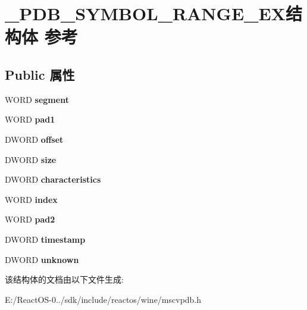 \hypertarget{struct___p_d_b___s_y_m_b_o_l___r_a_n_g_e___e_x}{}\section{\+\_\+\+P\+D\+B\+\_\+\+S\+Y\+M\+B\+O\+L\+\_\+\+R\+A\+N\+G\+E\+\_\+\+E\+X结构体 参考}
\label{struct___p_d_b___s_y_m_b_o_l___r_a_n_g_e___e_x}
\subsection*{Public 属性}
\begin{DoxyCompactItemize}
\item 
\mbox{\label{struct___p_d_b___s_y_m_b_o_l___r_a_n_g_e___e_x_a964df6111b7fced045dd6389792e33ec}} 
W\+O\+RD {\bfseries segment}
\item 
\mbox{\label{struct___p_d_b___s_y_m_b_o_l___r_a_n_g_e___e_x_accf9baa9d39d5050175b8f8a92213c52}} 
W\+O\+RD {\bfseries pad1}
\item 
\mbox{\label{struct___p_d_b___s_y_m_b_o_l___r_a_n_g_e___e_x_abb47c5de465886303caef059b462fe79}} 
D\+W\+O\+RD {\bfseries offset}
\item 
\mbox{\label{struct___p_d_b___s_y_m_b_o_l___r_a_n_g_e___e_x_a991e4667b04ad1c483434e9f9f84250e}} 
D\+W\+O\+RD {\bfseries size}
\item 
\mbox{\label{struct___p_d_b___s_y_m_b_o_l___r_a_n_g_e___e_x_a758443325ecdde3918be0b73a1a7ef1b}} 
D\+W\+O\+RD {\bfseries characteristics}
\item 
\mbox{\label{struct___p_d_b___s_y_m_b_o_l___r_a_n_g_e___e_x_adbe4299b80516b399b1712f8200e0b47}} 
W\+O\+RD {\bfseries index}
\item 
\mbox{\label{struct___p_d_b___s_y_m_b_o_l___r_a_n_g_e___e_x_a10b3e88641b7daa9f7cb648aedf4c337}} 
W\+O\+RD {\bfseries pad2}
\item 
\mbox{\label{struct___p_d_b___s_y_m_b_o_l___r_a_n_g_e___e_x_a03edcbb3b384202db4cc1a8b96252588}} 
D\+W\+O\+RD {\bfseries timestamp}
\item 
\mbox{\label{struct___p_d_b___s_y_m_b_o_l___r_a_n_g_e___e_x_a73cf6f4e6f276c00d8d42bd1cd31babb}} 
D\+W\+O\+RD {\bfseries unknown}
\end{DoxyCompactItemize}


该结构体的文档由以下文件生成\+:\begin{DoxyCompactItemize}
\item 
E\+:/\+React\+O\+S-\/0../sdk/include/reactos/wine/mscvpdb.\+h\end{DoxyCompactItemize}
